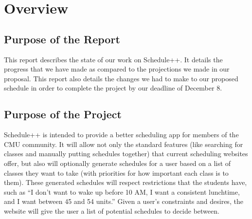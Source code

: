\section{Overview}
\subsection{Purpose of the Report}
  This report describes the state of our work on Schedule++. It details the
  progress that we have made as compared to the projections we made in our
  proposal. This report also details the changes we had to make to our proposed
  schedule in order to complete the project by our deadline of December 8.

\subsection{Purpose of the Project}
  Schedule++ is intended to provide a better scheduling app for members of the
  CMU community. It will allow not only the standard features (like searching
  for classes and manually putting schedules together) that current scheduling
  websites offer, but also will optionally generate schedules for a user based
  on a list of classes they want to take (with priorities for how important
  each class is to them). These generated schedules will respect restrictions
  that the students have, such as ``I don't want to wake up before 10 AM, I want
  a consistent lunchtime, and I want between 45 and 54 units.''
  Given a user's constraints and desires, the website will give the user a list
  of potential schedules to decide between.

